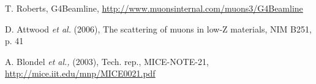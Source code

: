 \documentclass{jacow}
\begin{document}
\begin{thebibliography}{9}
T. Roberts, G4Beamline, \url{http://www.muonsinternal.com/muons3/G4Beamline}

D. Attwood \emph{et al.} (2006), The scattering of muons in low-Z materials, NIM B251, p. 41

A. Blondel \emph{et al.,} (2003), Tech. rep., MICE-NOTE-21, \url{http://mice.iit.edu/mnp/MICE0021.pdf} 

%
%
%
%


\end{thebibliography}
\ \\
\end{document}
